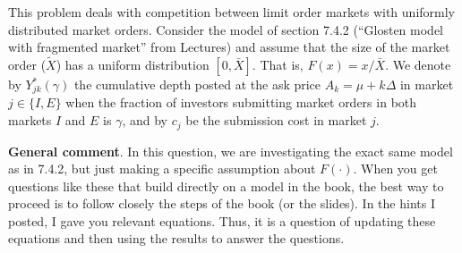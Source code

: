 \documentclass[11pt
, answers
]{exam}
\begin{document}
This problem deals with competition between limit order markets with uniformly distributed market orders. Consider the model of section 7.4.2 (``Glosten model with fragmented market'' from Lectures) and assume that the size of the market order ($\tilde{X}$) has a uniform distribution $[0,\bar{X}]$. That is, $F(x)=x/{\bar{X}}$. We denote by $Y^{*}_{jk}(\gamma)$ the cumulative depth posted at the ask price $A_{k}=\mu+k\Delta$ in market $j \in \{I,E\}$ when the fraction of investors submitting market orders in both markets $I$ and $E$ is $\gamma$, and by $c_{j}$ be the submission cost in market $j$.

\begin{solution}
	\noindent \textbf{General comment}. In this question, we are investigating the exact same model as in 7.4.2, but just making a specific assumption about $F(\cdot)$. When you get questions like these that build directly on a model in the book, the best way to proceed is to follow closely the steps of the book (or the slides). In the hints I posted, I gave you relevant equations. Thus, it is a question of updating these equations and then using the results to answer the questions.
\end{solution}
\end{document}

